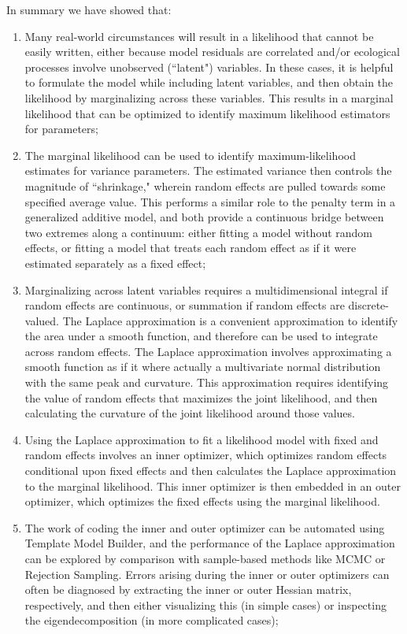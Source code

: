 In summary we have showed that:
\begin{enumerate}
    \item Many real-world circumstances will result in a likelihood that cannot be easily written, either because model residuals are correlated and/or ecological processes involve unobserved (``latent") variables.  In these cases, it is helpful to formulate the model while including latent variables, and then obtain the likelihood by marginalizing across these variables.  This results in a marginal likelihood that can be optimized to identify maximum likelihood estimators for parameters;  
    
    \item The marginal likelihood can be used to identify maximum-likelihood estimates for variance parameters. The estimated variance then controls the magnitude of ``shrinkage," wherein random effects are pulled towards some specified average value.  This performs a similar role to the penalty term in a generalized additive model, and both provide a continuous bridge between two extremes along a continuum: either fitting a model without random effects, or fitting a model that treats each random effect as if it were estimated separately as a fixed effect;

    \item Marginalizing across latent variables requires a multidimensional integral if random effects are continuous, or summation if random effects are discrete-valued. The Laplace approximation is a convenient approximation to identify the area under a smooth function, and therefore can be used to integrate across random effects.  The Laplace approximation involves approximating a smooth function as if it where actually a multivariate normal distribution with the same peak and curvature.  This approximation requires identifying  the value of random effects that maximizes the joint likelihood, and then calculating the curvature of the joint likelihood around those values.   
    
    \item Using the Laplace approximation to fit a likelihood model with fixed and random effects involves an inner optimizer, which optimizes random effects conditional upon fixed effects and then calculates the Laplace approximation to the marginal likelihood. This inner optimizer is then embedded in an outer optimizer, which optimizes the fixed effects using the marginal likelihood.

    \item The work of coding the inner and outer optimizer can be automated using Template Model Builder, and the performance of the Laplace approximation can be explored by comparison with sample-based methods like MCMC or Rejection Sampling.  Errors arising during the inner or outer optimizers can often be diagnosed by extracting the inner or outer Hessian matrix, respectively, and then either visualizing this (in simple cases) or inspecting the eigendecomposition (in more complicated cases);


\end{enumerate}
